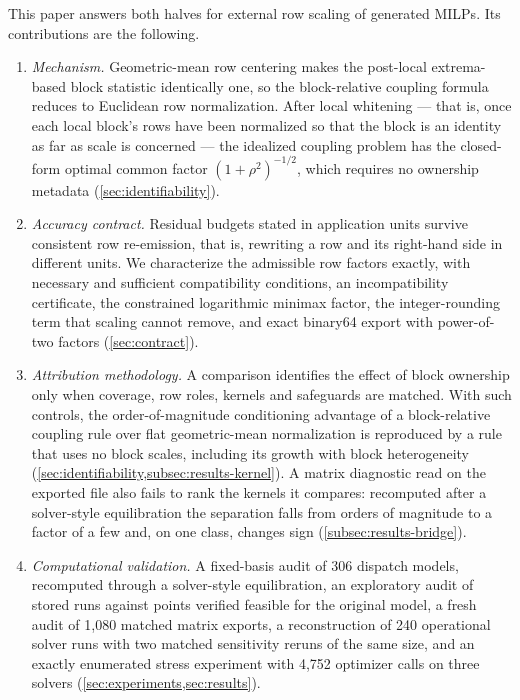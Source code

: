 \documentclass[smallextended,envcountsect,envcountsame]{svjour3}
\begin{document}
This paper answers both halves for external row scaling of generated MILPs. Its contributions
are the following.
\begin{enumerate}[label=(\Alph*),leftmargin=*,itemsep=2pt,topsep=3pt]
\item \emph{Mechanism.} Geometric-mean row centering makes the post-local extrema-based block
statistic identically one, so the block-relative coupling formula reduces to Euclidean row
normalization. After local whitening --- that is, once each local block's rows have been
normalized so that the block is an identity as far as scale is concerned --- the idealized
coupling problem has the closed-form
optimal common factor $(1+\rho^2)^{-1/2}$, which requires no ownership metadata
(\cref{sec:identifiability}).
\item \emph{Accuracy contract.} Residual budgets stated in application units survive consistent row
re-emission, that is, rewriting a row and its right-hand side in different units. We characterize the admissible row factors exactly, with necessary and sufficient
compatibility conditions, an incompatibility certificate, the constrained logarithmic minimax
factor, the integer-rounding term that scaling cannot remove, and exact binary64 export with
power-of-two factors (\cref{sec:contract}).
\item \emph{Attribution methodology.} A comparison identifies the effect of block ownership only when
coverage, row roles, kernels and safeguards are matched. With such controls, the
order-of-magnitude conditioning advantage of a block-relative coupling rule over flat
geometric-mean normalization is reproduced by a rule that uses no block scales, including its
growth with block heterogeneity (\cref{sec:identifiability,subsec:results-kernel}). A matrix
diagnostic read on the exported file also fails to rank the kernels it compares: recomputed
after a solver-style equilibration the separation falls from orders of magnitude to a factor
of a few and, on one class, changes sign (\cref{subsec:results-bridge}).
\item \emph{Computational validation.} A fixed-basis audit of 306 dispatch models, recomputed through a
solver-style equilibration, an exploratory audit of stored runs against points verified feasible
for the original model, a fresh audit of 1,080
matched matrix exports, a reconstruction of 240 operational solver runs with two
matched sensitivity reruns of the same size, and an exactly enumerated stress experiment with
4,752 optimizer calls on three solvers
(\cref{sec:experiments,sec:results}).
\end{enumerate}
\end{document}
